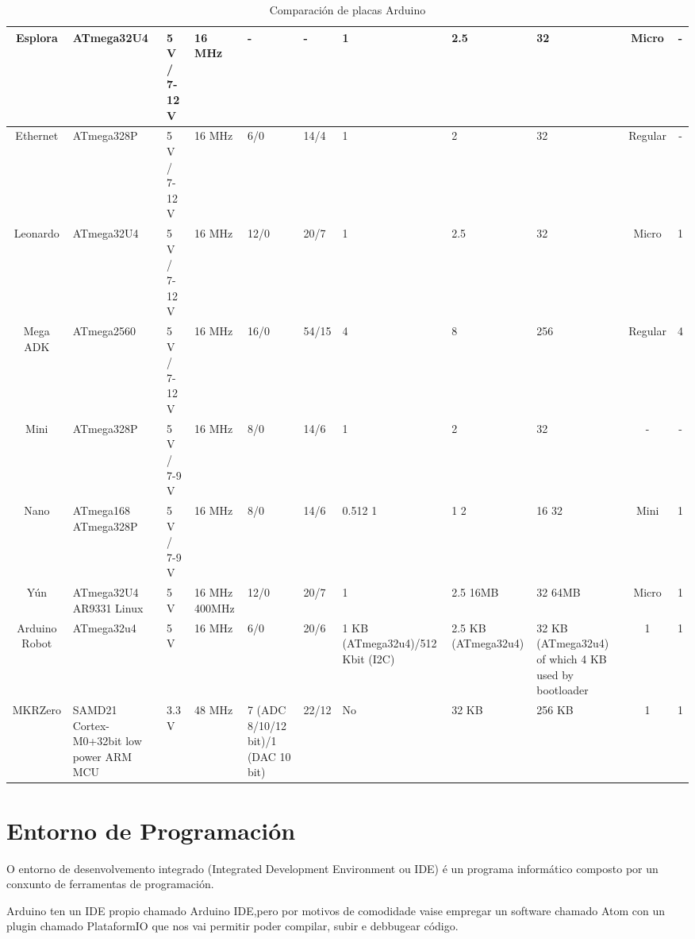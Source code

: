 \documentclass[11pt,twoside]{book}
\begin{document}
\begin{table}[htb]
\begin{center}
{\begin{tabular}{|c|m{3cm}|m{3.5cm}|m{2cm}|m{2cm}|m{2cm}|m{2cm}|m{2cm}|m{2cm}|c|c|}
\hline
Esplora & ATmega32U4 & 5 V / 7-12 V & 16 MHz & - & - & 1 & 2.5 & 32 & Micro & - \\
\hline
Ethernet & ATmega328P & 5 V / 7-12 V & 16 MHz & 6/0 & 14/4 & 1 & 2 & 32 & Regular & - \\
\hline
Leonardo & ATmega32U4 & 5 V / 7-12 V & 16 MHz & 12/0 & 20/7 & 1 & 2.5 & 32 & Micro & 1 \\
\hline
Mega ADK & ATmega2560 & 5 V / 7-12 V & 16 MHz & 16/0 & 54/15 & 4 & 8 & 256 & Regular & 4 \\
\hline
Mini & ATmega328P & 5 V / 7-9 V & 16 MHz & 8/0 & 14/6 & 1 & 2 & 32 & - & - \\
\hline
Nano & ATmega168 \newline ATmega328P & 5 V / 7-9 V & 16 MHz & 8/0 & 14/6 & 0.512  1 & 1  2 & 16 32 & Mini & 1 \\
\hline
Yún & ATmega32U4 \newline AR9331 Linux & 5 V & 16 MHz \newline 400MHz & 12/0 & 20/7 & 1 & 2.5 \newline  16MB & 32 \newline   64MB & Micro & 1 \\
\hline
Arduino Robot & ATmega32u4 & 5 V & 16 MHz & 6/0 & 20/6 & 1 KB (ATmega32u4)/512 Kbit (I2C) & 2.5 KB (ATmega32u4) & 32 KB (ATmega32u4) of which 4 KB used by bootloader & 1 & 1 \\
\hline
MKRZero & SAMD21 \newline  Cortex-M0+32bit low power \newline ARM MCU & 3.3 V & 48 MHz & 7 (ADC 8/10/12 bit)/1 (DAC 10 bit) & 22/12 & No & 32 KB & 256 KB & 1 & 1 \\
\hline
\end{tabular}
}
\caption{Comparación de placas Arduino}
\label{taboa:comparacion}
\end{center}
\end{table}

\section{Entorno de Programación}

O entorno de desenvolvemento integrado (Integrated Development Environment ou IDE) é un programa informático composto por un conxunto de ferramentas de programación. 

Arduino ten un IDE propio chamado Arduino IDE,pero por motivos de comodidade vaise empregar un software chamado Atom con un plugin chamado PlataformIO que nos vai permitir poder compilar, subir e debbugear código.
\end{document}
